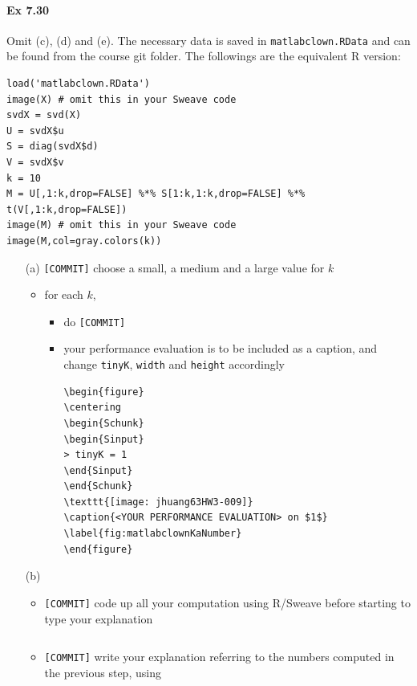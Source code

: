 \documentclass[12pt]{article}
\begin{document}
\paragraph{Ex 7.30}
Omit (c), (d) and (e).
The necessary data is saved in \verb+matlabclown.RData+
and can be found from the course git folder.
The followings are the equivalent R version:
\begin{lstlisting}
load('matlabclown.RData')
image(X) # omit this in your Sweave code
svdX = svd(X)
U = svdX$u
S = diag(svdX$d)
V = svdX$v
k = 10
M = U[,1:k,drop=FALSE] %*% S[1:k,1:k,drop=FALSE] %*% t(V[,1:k,drop=FALSE])
image(M) # omit this in your Sweave code
image(M,col=gray.colors(k))
\end{lstlisting}
\begin{itemize}
\item[(a)] \verb+[COMMIT]+ choose a small, a medium and a large value for $k$
\begin{itemize}
\item for each $k$,
\begin{itemize}
\item do \verb+[COMMIT]+
\item your performance evaluation is to be included as a caption,
and change \verb+tinyK+, \verb+width+ and \verb+height+ accordingly
\begin{lstlisting}
\begin{figure}
\centering
\begin{Schunk}
\begin{Sinput}
> tinyK = 1
\end{Sinput}
\end{Schunk}
\texttt{[image: jhuang63HW3-009]}
\caption{<YOUR PERFORMANCE EVALUATION> on $1$}
\label{fig:matlabclownKaNumber}
\end{figure}
\end{lstlisting}
\end{itemize}
\end{itemize}
\item[(b)]
\begin{itemize}
\item \verb+[COMMIT]+ code up all your computation using R/Sweave
before starting to type your explanation
\begin{lstlisting}
\end{lstlisting}
\item \verb+[COMMIT]+ write your explanation referring to the
numbers computed in the previous step, using
\verb++
\end{itemize}
\end{itemize}
\end{document}
